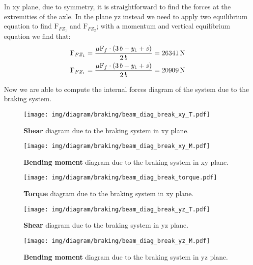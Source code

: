 \documentclass[a4paper,12pt]{article}
\begin{document}
In xy plane, due to symmetry, it is straightforward to find the forces at the extremities of the axle. 
In the plane yz instead we need to apply two equilibrium  equation to find $\text{F}_{FZ_1}$ and $\text{F}_{FZ_2}$; with a momentum and vertical equilibrium equation we find that:
\begin{align}
\text{F}_{FZ_1} &= \frac{\mu \text{F}_f \cdot (3\, b - y_1 + s)}{2\, b} = 26341 \,\text{N} \\
\text{F}_{FZ_1} &= \frac{\mu \text{F}_f \cdot (3\, b + y_1 + s)}{2\, b} = 20909 \,\text{N}
\end{align}

Now we are able to compute the internal forces diagram of the system due to the braking system.

\begin{figure}[H]
\centering
\caption{\textbf{Shear} diagram due to the braking system in xy plane.}
\texttt{[image: img/diagram/braking/beam\_diag\_break\_xy\_T.pdf]}
\label{beam_diag_break_xy_T}
\end{figure}

\begin{figure}[H]
\centering
\caption{\textbf{Bending moment} diagram due to the braking system in xy plane.}
\texttt{[image: img/diagram/braking/beam\_diag\_break\_xy\_M.pdf]}
\label{beam_diag_break_xy_M}
\end{figure}

\begin{figure}[H]
\centering
\caption{\textbf{Torque} diagram due to the braking system in xy plane.}
\texttt{[image: img/diagram/braking/beam\_diag\_break\_torque.pdf]}
\label{beam_diag_break_torque}
\end{figure}


\begin{figure}[H]
\centering
\caption{\textbf{Shear} diagram due to the braking system in yz plane.}
\texttt{[image: img/diagram/braking/beam\_diag\_break\_yz\_T.pdf]}
\label{beam_diag_break_xy_T}
\end{figure}

\begin{figure}[H]
\centering
\caption{\textbf{Bending moment} diagram due to the braking system in yz plane.}
\texttt{[image: img/diagram/braking/beam\_diag\_break\_yz\_M.pdf]}
\label{beam_diag_break_xy_M}
\end{figure}
\end{document}
